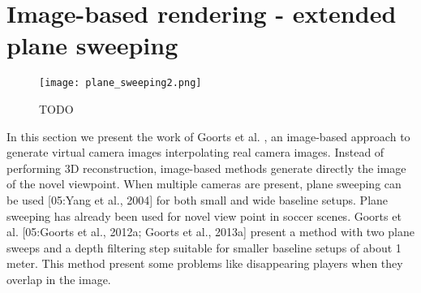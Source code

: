 \section{Image-based rendering - extended plane sweeping}


\begin{figure*}[htbp]
\centerline{\texttt{[image: plane\_sweeping2.png]}}
\caption{TODO}
\label{fig:plane_sweeping2}
\end{figure*}

In this section we present the work of Goorts et al. \cite{plane_sweeping}, an image-based approach to generate 
virtual camera images interpolating real camera images.
Instead of performing 3D reconstruction, image-based methods generate directly the image of the novel viewpoint.
When multiple cameras are present, plane sweeping can be used [05:Yang et al., 2004] for both small and wide 
baseline setups.
Plane sweeping has already been used for novel view point in soccer scenes. Goorts et al. [05:Goorts
et al., 2012a; Goorts et al., 2013a] present a method
with two plane sweeps and a depth filtering step suitable for smaller baseline 
setups of about 1 meter. 
This method present some problems like disappearing players
when they overlap in the image.

